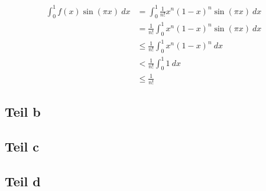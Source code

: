 \documentclass[a4paper,10pt]{article}
\begin{document}
\begin{align*}
 \int_0^1 f(x) \sin(\pi x)\ dx & = \int_0^1 \frac{1}{n!} x^n (1 - x)^n \sin(\pi x)\ dx\\
 & = \frac{1}{n!} \int_0^1 x^n (1 - x)^n \sin(\pi x)\ dx\\
 & \le \frac{1}{n!} \int_0^1 x^n (1 - x)^n\ dx\\
 & < \frac{1}{n!} \int_0^1 1 \ dx\\
 & \le \frac{1}{n!}
\end{align*}

\subsection*{Teil b}

\subsection*{Teil c}

\subsection*{Teil d}
\end{document}
